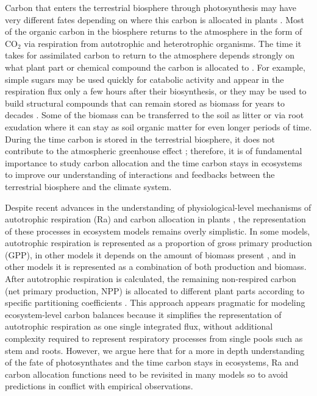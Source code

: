 \documentclass[bg, manuscript]{copernicus}
\begin{document}
\introduction  %
Carbon that enters the terrestrial biosphere through photosynthesis may have very different fates depending on where this carbon is allocated in plants \citep{Trumbore2006}. Most of the organic carbon in the biosphere returns to the atmosphere in the form of CO$_2$ via respiration from autotrophic and heterotrophic organisms. The time it takes for assimilated carbon to return to the atmosphere depends strongly on what plant part or chemical compound the carbon is allocated to \citep{Rasmussen2016, Luo2017, Lu2018, Herrera2020}. For example, simple sugars may be used quickly for catabolic activity and appear in the respiration flux only a few hours after their biosynthesis, or they may be used to build structural compounds that can remain stored as biomass for years to decades \citep{Hartmann2016}. Some of the biomass can be transferred to the soil as litter or via root exudation where it can stay as soil organic matter for even longer periods of time. During the time carbon is stored in the terrestrial biosphere, it does not contribute to the atmospheric greenhouse effect \citep{Neubauer2015,Sierra2021BGS}; therefore, it is of fundamental importance to study carbon allocation and the time carbon stays in ecosystems to improve our understanding of interactions and feedbacks between the terrestrial biosphere and the climate system. 

Despite recent advances in the understanding of physiological-level mechanisms of autotrophic respiration (Ra) and carbon allocation in plants \citep{Hartmann2016}, the representation of these processes in ecosystem models remains overly simplistic. In some models, autotrophic respiration is represented as a proportion of gross primary production (GPP), in other models it depends on the amount of biomass present \citep{Collalti2020}, and in other models it is represented as a combination of both production and biomass. After autotrophic respiration is calculated, the remaining non-respired carbon (net primary production, NPP) is allocated to different plant parts according to specific partitioning coefficients \citep{Franklin2012, Ceballos2020}. This approach appears pragmatic for modeling ecosystem-level carbon balances because it simplifies the representation of autotrophic respiration as one single integrated flux, without additional complexity required to represent respiratory processes from single pools such as stem and roots. However, we argue here that for a more in depth understanding of the fate of photosynthates and the time carbon stays in ecosystems, Ra and carbon allocation functions need to be revisited in many models so to avoid predictions in conflict with empirical observations. 
\end{document}

